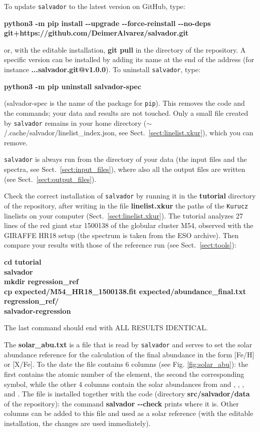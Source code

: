 \documentclass[modern]{aastex701}
\begin{document}
To update \texttt{salvador} to the latest version on GitHub, type:
\begin{center}
    \textbf{python3 -m pip install -{}-upgrade -{}-force-reinstall -{}-no-deps git+https://github.com/DeimerAlvarez/salvador.git}
\end{center}
or, with the editable installation, {\bf git pull} in the directory of the repository. A specific version can be installed by adding its name at the end of the address (for instance {\bf ...salvador.git@v1.0.0}). To uninstall \texttt{salvador}, type:
\begin{center}
    \textbf{python3 -m pip uninstall salvador-spec}
\end{center}
(salvador-spec is the name of the package for \texttt{pip}). This removes the code and the commands; your data and results are not touched. Only a small file created by \texttt{salvador} remains in your home directory ($\sim$/.cache/salvador/linelist\_index.json, see Sect.~\ref{sect:linelist.xkur}), which you can remove.

\texttt{salvador} is always run from the directory of your data (the input files and the spectra, see Sect.~\ref{sect:input_files}), where also all the output files are written (see Sect.~\ref{sect:output_files}). 

Check the correct installation of \texttt{salvador} by running it in the \textbf{tutorial} directory of the repository, after writing in the file {\bf linelist.xkur} the paths of the \texttt{Kurucz} linelists on your computer (Sect.~\ref{sect:linelist.xkur}). The tutorial analyzes 27 lines of the red giant star 1500138 of the globular cluster M54, observed with the GIRAFFE HR18 setup (the spectrum is taken from the ESO archive). Then compare your results with those of the reference run (see Sect.~\ref{sect:tools}):
\begin{center}
    \textbf{cd tutorial} \\
    \textbf{salvador} \\
    \textbf{mkdir regression\_ref} \\
    \textbf{cp expected/M54\_HR18\_1500138.fit expected/abundance\_final.txt regression\_ref/} \\
    \textbf{salvador-regression}
\end{center}
The last command should end with ALL RESULTS IDENTICAL.

The {\bf solar\_abu.txt} is a file that is read by \texttt{salvador} and serves to set the solar abundance reference for the calculation of the final abundance in the form [Fe/H] or [X/Fe]. To the date the file contains 6 columns (see Fig. \ref{fig:solar_abu}): the first contains the atomic number of the element, the second the corresponding symbol, while the other 4 columns contain the solar abundances from \citet{caffau_11} and \citet{lodders_10}, \citet{grevesse_98}, \citet{magg_22}, and \citet{asplund_09}. The file is installed together with the code (directory {\bf src/salvador/data} of the repository): the command {\bf salvador -{}-check} prints where it is. Other columns can be added to this file and used as a solar reference (with the editable installation, the changes are used immediately). 
\end{document}

